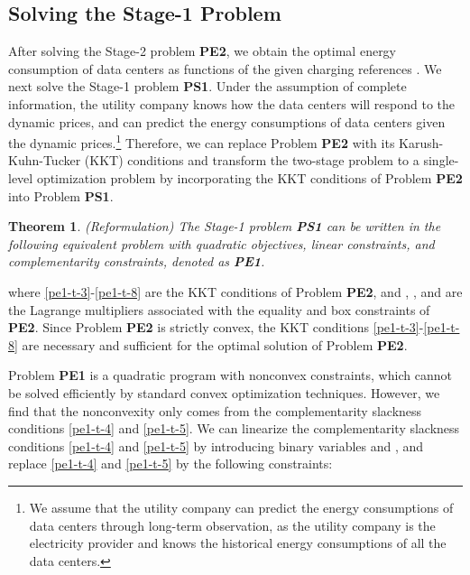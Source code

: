 \documentclass[journal]{IEEEtran}
\newtheorem{theorem}{Theorem}
\begin{document}
	\subsection{Solving the Stage-1 Problem}
	After solving the Stage-2 problem \textbf{PE2}, we obtain the optimal energy consumption of data centers as functions of the given charging references . We next solve the Stage-1 problem \textbf{PS1}. Under the assumption of complete information, the utility company knows how the data centers will respond to the dynamic prices, and can predict the energy consumptions of data centers given the dynamic prices.\footnote{We assume that the utility company can predict the energy consumptions of data centers through long-term observation, as the utility company is the electricity provider and knows the historical energy consumptions of all the data centers.} Therefore, we can replace Problem \textbf{PE2} with its Karush-Kuhn-Tucker (KKT) conditions and transform the two-stage problem to a single-level optimization problem \cite{kktmethod} by incorporating the KKT conditions of Problem \textbf{PE2} into Problem \textbf{PS1}.
	\begin{theorem}\label{reformulate_lp}
		(Reformulation) The Stage-1 problem \textbf{PS1} can be written in the following equivalent problem with quadratic objectives, linear constraints, and complementarity constraints, denoted as \textbf{PE1}.
	\end{theorem}
	
	
	where \eqref{pe1-t-3}-\eqref{pe1-t-8} are the KKT conditions of Problem \textbf{PE2}, and , , and  are the Lagrange multipliers associated with the equality and box constraints of \textbf{PE2}. Since Problem \textbf{PE2} is strictly convex, the KKT conditions \eqref{pe1-t-3}-\eqref{pe1-t-8} are necessary and sufficient for the optimal solution of Problem \textbf{PE2}.
	
	Problem \textbf{PE1} is a quadratic program with nonconvex constraints, which cannot be solved efficiently by standard convex optimization techniques. However, we find that the nonconvexity only comes from the complementarity slackness conditions \eqref{pe1-t-4} and \eqref{pe1-t-5}. We can linearize the complementarity slackness conditions \eqref{pe1-t-4} and \eqref{pe1-t-5} by introducing binary variables  and , and replace \eqref{pe1-t-4} and \eqref{pe1-t-5} by the following constraints:
	
\end{document}
